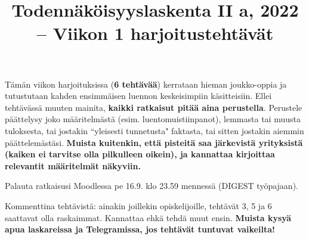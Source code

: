 \documentclass[11pt,a4paper]{amsart}
\title{Todennäköisyyslaskenta II a, 2022 -- Viikon 1 harjoitustehtävät}
\newcommand{\1}{\mathbf{1}}
\begin{document}
\maketitle

Tämän viikon harjoituksissa ({\bf 6 tehtävää}) kerrataan hieman joukko-oppia ja tutustutaan kahden ensimmäisen luennon keskeisimpiin käsitteisiin. Ellei tehtävässä muuten mainita,  {\bf kaikki ratkaisut pitää aina perustella}. Perustele päättelysy joko määritelmästä (esim. luentomuistiinpanot), lemmasta tai muusta tuloksesta, tai jostakin ``yleisesti tunnetusta" faktasta, tai sitten jostakin aiemmin päättelemästäsi. {\bf Muista kuitenkin, että pisteitä saa järkevistä yrityksistä (kaiken ei tarvitse olla pilkulleen oikein), ja kannattaa kirjoittaa relevantit määritelmät näkyviin.}

Palauta ratkaisusi Moodlessa pe 16.9. klo 23.59 mennessä (DIGEST työpajaan).

\medskip

Kommenttina tehtävistä: ainakin joillekin opiskelijoille, tehtävät 3, 5 ja 6 saattavat olla raskaimmat. Kannattaa ehkä tehdä muut ensin. {\bf Muista kysyä apua laskareissa ja Telegramissa, jos tehtävät tuntuvat vaikeilta!}


\medskip 
\end{document}
